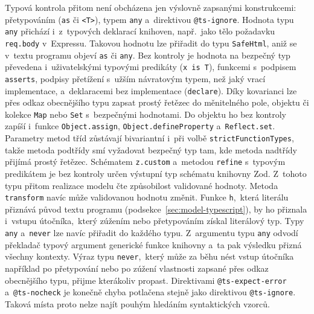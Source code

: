 Typová kontrola přitom není obcházena jen výslovně zapsanými konstrukcemi: přetypováním (\texttt{as} či \texttt{<T>}), typem \texttt{any} a~direktivou \texttt{@ts-ignore}. Hodnota typu \texttt{any} přichází i~z~typových deklarací knihoven, např.~jako tělo požadavku \texttt{req.body} v~Expressu. Takovou hodnotu lze přiřadit do typu \texttt{SafeHtml}, aniž se v~textu programu objeví \texttt{as} či \texttt{any}. Bez kontroly je hodnota na bezpečný typ převedena i~uživatelskými typovými predikáty (\texttt{x is T}), funkcemi s~podpisem \texttt{asserts}, podpisy přetížení s~užším návratovým typem, než jaký vrací implementace, a~deklaracemi bez implementace (\texttt{declare}). Díky kovarianci lze přes odkaz obecnějšího typu zapsat prostý řetězec do měnitelného pole, objektu či kolekce \texttt{Map} nebo \texttt{Set} s~bezpečnými hodnotami. Do objektu ho bez kontroly zapíší i~funkce \texttt{Object.assign}, \texttt{Object.defineProperty} a~\texttt{Reflect.set}. Parametry metod tříd zůstávají bivariantní i~při volbě \texttt{strictFunctionTypes}, takže metoda podtřídy smí vyžadovat bezpečný typ tam, kde metoda nadtřídy přijímá prostý řetězec. Schématem \texttt{z.custom} a~metodou \texttt{refine} s~typovým predikátem je bez kontroly určen výstupní typ schématu knihovny Zod. Z~tohoto typu přitom realizace modelu čte způsobilost validované hodnoty. Metoda \texttt{transform} navíc může validovanou hodnotu změnit. Funkce \texttt{h},~která literálu přiznává původ textu programu (podsekce~\ref{sec:model-typescript}), by ho přiznala i~vstupu útočníka,~který zúžením nebo přetypováním získal literálový typ. Typy \texttt{any} a~\texttt{never} lze navíc přiřadit do každého typu. Z~argumentu typu \texttt{any} odvodí překladač typový argument generické funkce knihovny a~ta pak výsledku přizná všechny kontexty. Výraz typu \texttt{never},~který může za běhu nést vstup útočníka například po přetypování nebo po zúžení vlastnosti zapsané přes odkaz obecnějšího typu, přijme kterákoliv propast. Direktivami \texttt{@ts-expect-error} a~\texttt{@ts-nocheck} je konečně chyba potlačena stejně jako direktivou \texttt{@ts-ignore}. Taková místa proto nelze najít pouhým hledáním syntaktických vzorců.

